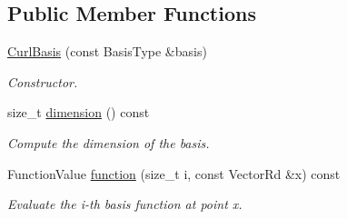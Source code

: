 \subsection*{Public Member Functions}
\begin{DoxyCompactItemize}
\item 
\mbox{\label{classHArDCore3D_1_1CurlBasis_af0423afdb02f0b69b206709290b71325}} 
\hyperlink{classHArDCore3D_1_1CurlBasis_af0423afdb02f0b69b206709290b71325}{Curl\+Basis} (const Basis\+Type \&basis)
\begin{DoxyCompactList}\small\item\em Constructor. \end{DoxyCompactList}\item 
\mbox{\label{classHArDCore3D_1_1CurlBasis_af49ecdf88a5895335f602276d81a805b}} 
size\+\_\+t \hyperlink{classHArDCore3D_1_1CurlBasis_af49ecdf88a5895335f602276d81a805b}{dimension} () const
\begin{DoxyCompactList}\small\item\em Compute the dimension of the basis. \end{DoxyCompactList}\item 
\mbox{\label{classHArDCore3D_1_1CurlBasis_a5476b7c9f36899f48fdb549f25974b27}} 
Function\+Value \hyperlink{classHArDCore3D_1_1CurlBasis_a5476b7c9f36899f48fdb549f25974b27}{function} (size\+\_\+t i, const Vector\+Rd \&x) const
\begin{DoxyCompactList}\small\item\em Evaluate the i-\/th basis function at point x. \end{DoxyCompactList}\end{DoxyCompactItemize}
